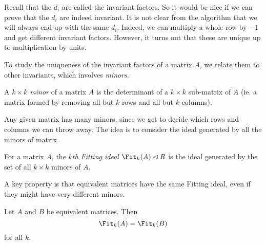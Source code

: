 \documentclass[a4paper]{article}
\begin{document}
Recall that the $d_i$ are called the invariant factors. So it would be nice if we can prove that the $d_i$ are indeed invariant. It is not clear from the algorithm that we will always end up with the same $d_i$. Indeed, we can multiply a whole row by $-1$ and get different invariant factors. However, it turns out that these are unique up to multiplication by units.

To study the uniqueness of the invariant factors of a matrix $A$, we relate them to other invariants, which involves \emph{minors}.
\begin{defi}[Minor]
  A \emph{$k \times k$ minor} of a matrix $A$ is the determinant of a $k \times k$ sub-matrix of $A$ (ie. a matrix formed by removing all but $k$ rows and all but $k$ columns).
\end{defi}
Any given matrix has many minors, since we get to decide which rows and columns we can throw away. The idea is to consider the ideal generated by all the minors of matrix.

\begin{defi}
  For a matrix $A$, the \emph{$k$th Fitting ideal} $\Fit_k(A) \lhd R$ is the ideal generated by the set of all $k \times k$ minors of $A$.
\end{defi}
A key property is that equivalent matrices have the same Fitting ideal, even if they might have very different minors.

\begin{lemma}
  Let $A$ and $B$ be equivalent matrices. Then
  \[
    \Fit_k(A) = \Fit_k(B)
  \]
  for all $k$.
\end{lemma}
\end{document}
